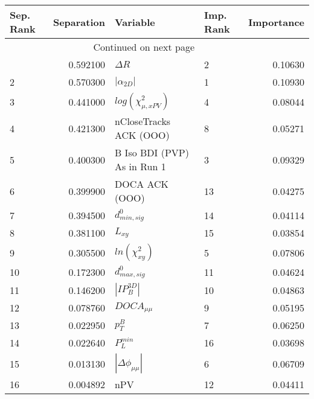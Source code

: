 \usepackage{lscape}

\begin{landscape}
\begin{longtable}{lrllr}
\toprule
Sep. Rank &  Separation &                     Variable & Imp. Rank &  Importance \\
\midrule
\endhead
\midrule
\multicolumn{3}{r}{{Continued on next page}} \\
\midrule
\endfoot

\bottomrule
\endlastfoot
        1 &    0.592100 &                   $\Delta R$ &         2 &     0.10630 \\
        2 &    0.570300 &              $|\alpha_{2D}|$ &         1 &     0.10930 \\
        3 &    0.441000 &    $log(\chi^{2}_{\mu,xPV})$ &         4 &     0.08044 \\
        4 &    0.421300 &       nCloseTracks ACK (OOO) &         8 &     0.05271 \\
        5 &    0.400300 &  B Iso BDI (PVP) As in Run 1 &         3 &     0.09329 \\
        6 &    0.399900 &               DOCA ACK (OOO) &        13 &     0.04275 \\
        7 &    0.394500 &             $d^0_{min, sig}$ &        14 &     0.04114 \\
        8 &    0.381100 &                     $L_{xy}$ &        15 &     0.03854 \\
        9 &    0.305500 &          $ln(\chi^{2}_{xy})$ &         5 &     0.07806 \\
       10 &    0.172300 &             $d^0_{max, sig}$ &        11 &     0.04624 \\
       11 &    0.146200 &              $|IP_{B}^{3D}|$ &        10 &     0.04863 \\
       12 &    0.078760 &              $DOCA_{\mu\mu}$ &         9 &     0.05195 \\
       13 &    0.022950 &                    $p^B_{T}$ &         7 &     0.06250 \\
       14 &    0.022640 &                $P^{min}_{L}$ &        16 &     0.03698 \\
       15 &    0.013130 &     $|\Delta \phi_{\mu\mu}|$ &         6 &     0.06709 \\
       16 &    0.004892 &                          nPV &        12 &     0.04411 \\
\end{longtable}

\end{landscape}
